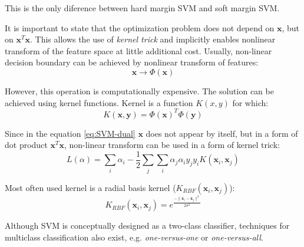 This is the only diference between hard margin SVM and soft margin SVM.

It is important to state that the optimization problem does not depend on $\mathbf{x}$, but on $\mathbf{x}^T\mathbf{x}$. This allows the use of \emph{kernel trick} and implicitly enables nonlinear transform of the feature space at little additional cost. Usually, non-linear decision boundary can be achieved by nonlinear transform of features:
\begin{equation} 
\mathbf{x} \rightarrow \Phi(\mathbf{x})
\end{equation}

However, this operation is computationally expensive. The solution can be achieved using kernel functions. Kernel is a function $K(x,y)$ for which:
\begin{equation} 
K(\mathbf{x},\mathbf{y}) = \Phi(\mathbf{x})^T  \Phi(\mathbf{y})
\end{equation}

Since in the equation \ref{eq:SVM-dual} $\mathbf{x}$ does not appear by itself, but in a form of dot product $\mathbf{x}^T\mathbf{x}$, non-linear transform can be used in a form of kernel trick:
\begin{equation} 
L(\alpha) = \sum_i \alpha_i - \frac{1}{2} \sum_j \sum_i \alpha_j \alpha_i y_j y_i K(\mathbf{x}_i, \mathbf{x}_j)
\end{equation}

Most often used kernel is a radial basis kernel ($K_{RBF}(\mathbf{x}_i,\mathbf{x}_j)$):
\begin{equation} 
K_{RBF}(\mathbf{x}_i,\mathbf{x}_j) = e^\frac{-\parallel \mathbf{x}_i - \mathbf{x}_j\parallel^2}{2\sigma^2}
\end{equation}

Although SVM is conceptually designed as a two-class classifier, techniques for multiclass classification also exist, e.g. \emph{one-versus-one} or \emph{one-versus-all}.



\

